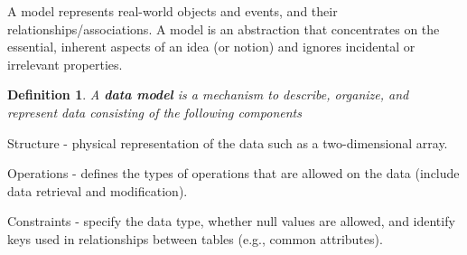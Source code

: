 \documentclass{article}
\newtheorem{definition}{Definition}
\begin{document}
A model represents real-world objects and events, and their relationships/associations.  A model is an abstraction that concentrates on the essential, inherent aspects of an idea (or notion) and ignores incidental or irrelevant  properties.   
%



%
\begin{definition}

 A \textbf{data model} is a mechanism to describe, organize, and represent data consisting of the following components%
\end{definition}

\begin{outline}[enumerate]
    \1 Structure - physical representation of the data such as a two-dimensional array.  
    
    \1 Operations -  defines the types of operations that are allowed on the data (include data retrieval and modification).
    
    \1 Constraints - specify the data type, whether null values are allowed, and identify keys used in relationships between tables (e.g., common attributes).  
\end{outline}
 



\end{document}
